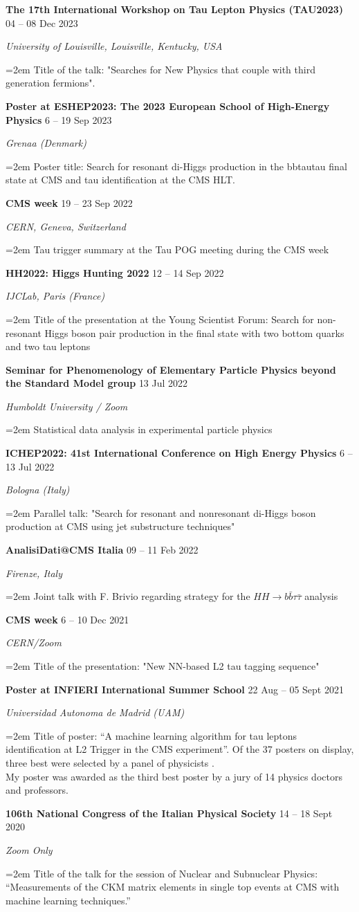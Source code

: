 \documentclass[fontsize=12pt]{article} %
\newcommand{\openquote}{``}
\newcommand{\closequote}{''}
\newcommand{\hhbbtt}{$ HH \rightarrow b\bar{b}\tau\bar{\tau}$ }
\newcommand{\sepspace}{\vspace*{1em}}		%
\newcommand{\EducationEntry}[4]{
	\noindent \textbf{#1} \hfill      %
	{#2} \par  %
	\noindent \textit{#3} \par        %
	\noindent\hangindent=2em\hangafter=0 \small #4 %
	\normalsize \par}
\begin{document}
	\EducationEntry{The 17th International Workshop on Tau Lepton Physics (TAU2023)}{04 {--} 08 Dec 2023}{University of Louisville, Louisville, Kentucky, USA}{Title of the talk: "Searches for New Physics that couple with third generation fermions". \cite{Tau2023}}
	\sepspace
	\EducationEntry{Poster at ESHEP2023: The 2023 European School of High-Energy Physics}{6 {--} 19 Sep 2023}{Grenaa (Denmark)}{Poster title: Search for resonant di-Higgs production in the bbtautau final state at CMS and tau identification at the CMS HLT. \cite{ESHEP_Indico}}
	\sepspace
	\EducationEntry{CMS week}{19 {--} 23 Sep 2022}{CERN, Geneva, Switzerland}{Tau trigger summary at the Tau POG meeting during the CMS week \cite{cmsWeek22}}
	\sepspace
	\EducationEntry{HH2022: Higgs Hunting 2022}{12 {--} 14 Sep 2022}{IJCLab, Paris (France)}{Title of the presentation at the Young Scientist Forum: Search for non-resonant Higgs boson pair production in the final state with two bottom quarks and two tau leptons \cite{HH2022}}
	\sepspace
	\EducationEntry{Seminar for Phenomenology of Elementary Particle Physics beyond the Standard Model group}{13 Jul 2022}{Humboldt University / Zoom}{Statistical data analysis in experimental particle physics \cite{humbolt}}
	\sepspace
	\EducationEntry{ICHEP2022: 41st International Conference on High Energy Physics}{6 {--} 13 Jul 2022}{Bologna (Italy)}{Parallel talk: "Search for resonant and nonresonant di-Higgs boson production at CMS using jet substructure techniques" \cite{ICHEP}}
	\sepspace
	\EducationEntry{AnalisiDati@CMS Italia}{09 {--} 11 Feb 2022}{Firenze, Italy}{Joint talk with F. Brivio regarding strategy for the \hhbbtt analysis \cite{analisidatifirenze}}
	\sepspace
	\EducationEntry{CMS week}{ 6 {--} 10 Dec 2021}{CERN/Zoom}{\vspace{-2mm}Title of the presentation: "New NN-based L2 tau tagging sequence" \cite{cmsweek21}}
	\sepspace
	\EducationEntry{Poster at INFIERI International Summer School}{ 22 Aug {--} 05 Sept 2021}{Universidad Autonoma de Madrid (UAM)}{Title of poster: \openquote A machine learning algorithm for tau leptons identification at L2 Trigger in the CMS experiment\closequote. Of the 37 posters on display, three best were selected by a panel of physicists \cite{infieri_poster}.\\ My poster was awarded as the third best poster by a jury of 14 physics doctors and professors.}
	\sepspace
	\EducationEntry{106th National Congress of the Italian Physical Society}{14 {--} 18 Sept 2020}{Zoom Only}{Title of the talk for the session of Nuclear and Subnuclear Physics: \openquote Measurements of the CKM matrix elements in single top events at CMS with machine learning techniques.\closequote \;\cite{CongresSIF}}
\end{document}
